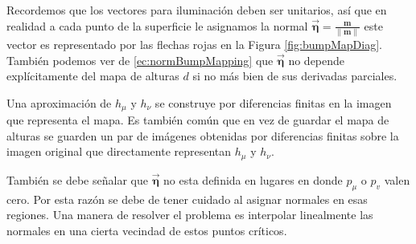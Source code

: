 Recordemos que los vectores para iluminación deben ser unitarios, así que en realidad a cada punto de la superficie le asignamos la normal $\vec{\boldsymbol\eta} = \frac{\textbf{m}}{\| \textbf{m} \|}$ este vector es representado por las flechas rojas en la Figura \ref{fig:bumpMapDiag}. También podemos ver de \eqref{ec:normBumpMapping} que $\vec{\boldsymbol\eta}$ no depende explícitamente del mapa de alturas $d$ si no más bien de sus derivadas parciales.

Una aproximación de $h_\mu$ y $h_\nu$ se construye por diferencias finitas en la imagen que representa el mapa. Es también común que en vez de guardar el mapa de alturas se guarden un par de imágenes obtenidas por diferencias finitas sobre la imagen original que directamente representan $h_\mu$ y $h_\nu$.

También se debe señalar que $\vec{\boldsymbol\eta}$ no esta definida en lugares en donde $p_\mu$ o $p_v$ valen cero. Por esta razón se debe de tener cuidado al asignar normales en esas regiones. Una manera de resolver el problema es interpolar linealmente las normales en una cierta vecindad de estos puntos críticos.